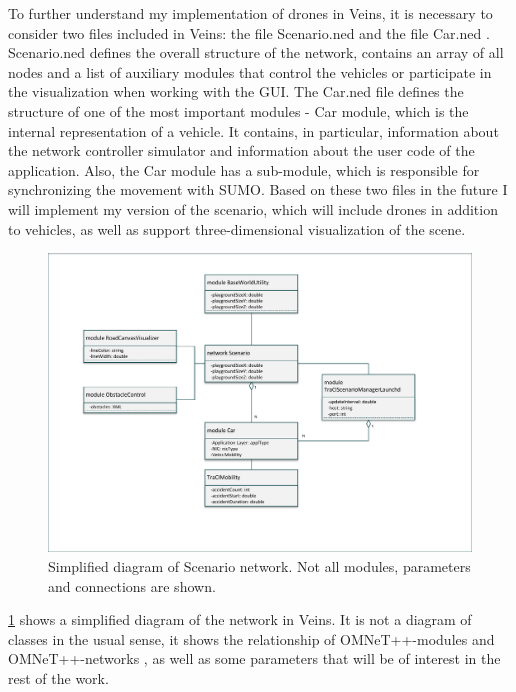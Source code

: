\documentclass[]{nsm-thesis}
\begin{document}
To further understand my implementation of drones in Veins, it is necessary to consider two files included in Veins: the file Scenario.ned \cite{scenarioned} and the file Car.ned \cite{carned}. Scenario.ned defines the overall structure of the network, contains an array of all nodes and a list of auxiliary modules that control the vehicles or participate in the visualization when working with the GUI. The Car.ned file defines the structure of one of the most important modules - Car module, which is the internal representation of a vehicle. It contains, in particular, information about the network controller simulator and information about the user code of the application. Also, the Car module has a sub-module, which is responsible for synchronizing the movement with SUMO. Based on these two files in the future I will implement my version of the scenario, which will include drones in addition to vehicles, as well as support three-dimensional visualization of the scene. 

\begin{figure}
	\centering
	\includegraphics[width=1\textwidth]{figures/Scenario.pdf}
	\caption{Simplified diagram of Scenario \cite{scenarioned} network. Not all modules, parameters and connections are shown.}
	\label{fig:scenarioned}
\end{figure}

\cref{fig:scenarioned} shows a simplified diagram of the network in Veins. It is not a diagram of classes in the usual sense, it shows the relationship of OMNeT++-modules and OMNeT++-networks , as well as some parameters that will be of interest in the rest of the work. 
\end{document}
